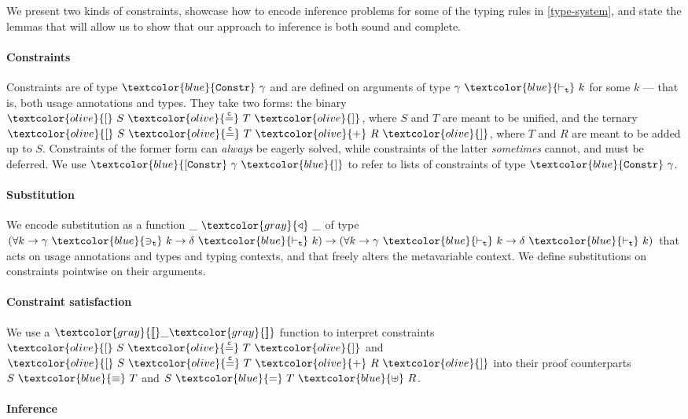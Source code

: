\documentclass[sigplan,screen,review]{acmart}
\newcommand{\constr}[1]{\textcolor{olive}{\mathtt{#1}}}
\newcommand{\func}[1]{\textcolor{gray}{\mathtt{#1}}}
\newcommand{\type}[1]{\textcolor{blue}{\mathtt{#1}}}
\newcommand{\tvar}[2]{#1 ~\type{\ni_t}~ #2}
\newcommand{\tkind}[2]{#1 ~\type{\vdash_t}~ #2}
\newcommand{\tSplit}[3]{#1~\type{=}~#2~\type{\uplus}~#3}
\newcommand{\tEq}[2]{#1~\type{\equiv}~#2}
\newcommand{\tConstr}[1]{\type{Constr} ~ #1}
\newcommand{\tConstrs}[1]{\type{[Constr} ~ #1 ~ \type{]}}
\newcommand{\subst}[2]{#1 ~ \func{\triangleleft} ~ #2}
\newcommand{\interpr}[1]{\func{[\![} #1 \func{]\!]}}
\newcommand{\eqconstr}[2]{\constr{[} ~ #1 ~ \constr{\stackrel{c}{=}} ~ #2 ~ \constr{]}}
\newcommand{\sumconstr}[3]{\constr{[} ~ #1 ~ \constr{\stackrel{c}{=}} ~ #2 ~ \constr{+} ~ #3 ~ \constr{]}}
\begin{document}
We present two kinds of constraints, showcase how to encode inference problems for some of the typing rules in \autoref{type-system}, and state the lemmas that will allow us to show that our approach to inference is both sound and complete.

\paragraph{Constraints}

Constraints are of type $\tConstr{\gamma}$ and are defined on arguments of type $\tkind{\gamma}{k}$ for some $k$ --- that is, both usage annotations and types.
They take two forms: the binary $\eqconstr{S}{T}$, where $S$ and $T$ are meant to be unified, and the ternary $\sumconstr{S}{T}{R}$, where $T$ and $R$ are meant to be added up to $S$.
Constraints of the former form can \emph{always} be eagerly solved, while constraints of the latter \emph{sometimes} cannot, and must be deferred.
We use $\tConstrs{\gamma}$ to refer to lists of constraints of type $\tConstr{\gamma}$.

\paragraph{Substitution}


We encode substitution as a function $\subst{\_}{\_}$ of type $(\forall k \to \tvar{\gamma}{k} \to \tkind{\delta}{k}) \to (\forall k \to \tkind{\gamma}{k} \to \tkind{\delta}{k})$ that acts on usage annotations and types and typing contexts, and that freely alters the metavariable context.
We define substitutions on constraints pointwise on their arguments.

\paragraph{Constraint satisfaction}

We use a $\interpr{\_}$ function to interpret constraints $\eqconstr{S}{T}$ and $\sumconstr{S}{T}{R}$ into their proof counterparts $\tEq{S}{T}$ and $\tSplit{S}{T}{R}$.

\paragraph{Inference}
\end{document}
